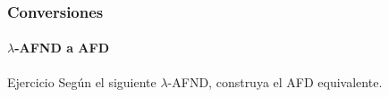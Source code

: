 \documentclass{beamer}
\begin{document}
        \begin{frame}
			\frametitle{Conversiones}
			\framesubtitle{$\lambda$-AFND a AFD}

            \begin{exampleblock}{Ejercicio}
               Seg\'un el siguiente $\lambda$-AFND, construya el AFD equivalente.
               \begin{center}
			   \end{center}
            \end{exampleblock}
		\end{frame}		
\end{document}
